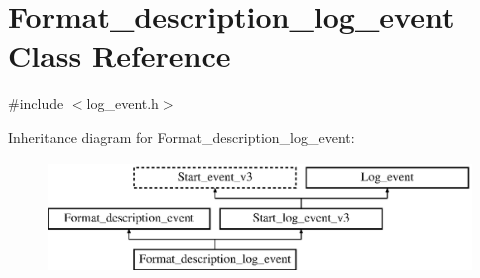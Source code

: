 \hypertarget{classFormat__description__log__event}{}\section{Format\+\_\+description\+\_\+log\+\_\+event Class Reference}
\label{classFormat__description__log__event}


{\ttfamily \#include $<$log\+\_\+event.\+h$>$}

Inheritance diagram for Format\+\_\+description\+\_\+log\+\_\+event\+:\begin{figure}[H]
\begin{center}
\leavevmode
\includegraphics[height=2.947368cm]{classFormat__description__log__event}
\end{center}
\end{figure}
